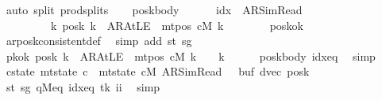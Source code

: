 \begin{isabellebody}
\ {\isacharparenleft}{\kern0pt}auto\ split{\isacharcolon}{\kern0pt}\ prod{\isachardot}{\kern0pt}splits{\isacharparenright}{\kern0pt}\isanewline
\ \ \isamarkupfalse%
\ posk{\isacharunderscore}{\kern0pt}body{\isacharcolon}{\kern0pt}\isanewline
\ \ \ \ \ \ {\isachardoublequoteopen}idx\ {\isacharequal}{\kern0pt}\ AR{\isacharunderscore}{\kern0pt}SimRead\isanewline
\ \ \ \ \ \ \ \ {\isasymlongrightarrow}\ {\isacharparenleft}{\kern0pt}{\isasymforall}k{\isachardot}{\kern0pt}\ posk{}\ k\ {\isacharequal}{\kern0pt}\ AR{\isacharunderscore}{\kern0pt}AtLE\ {\isasymlongleftrightarrow}\ mt{\isacharunderscore}{\kern0pt}pos\ cM\ k\ {\isacharequal}{\kern0pt}\ {}{\isacharparenright}{\kern0pt}{\isachardoublequoteclose}\isanewline
\ \ \ \ \isamarkupfalse%
\ posk{\isacharunderscore}{\kern0pt}ok\ \isamarkupfalse%
\ ar{\isacharunderscore}{\kern0pt}posk{\isacharunderscore}{\kern0pt}consistent{\isacharunderscore}{\kern0pt}def\ \isamarkupfalse%
\ {\isacharparenleft}{\kern0pt}simp\ add{\isacharcolon}{\kern0pt}\ st\ sg{\isacharparenright}{\kern0pt}\isanewline
\ \ \isamarkupfalse%
\ pkok{\isacharcolon}{\kern0pt}\ {\isachardoublequoteopen}posk{}\ k\ {\isacharequal}{\kern0pt}\ AR{\isacharunderscore}{\kern0pt}AtLE\ {\isasymlongleftrightarrow}\ mt{\isacharunderscore}{\kern0pt}pos\ cM\ k\ {\isacharequal}{\kern0pt}\ {}{\isachardoublequoteclose}\ \ k\isanewline
\ \ \ \ \isamarkupfalse%
\ posk{\isacharunderscore}{\kern0pt}body\ idx{\isacharunderscore}{\kern0pt}eq\ \isamarkupfalse%
\ simp\isanewline
\ \ \isamarkupfalse%
\ c{\isacharprime}{\kern0pt}{\isacharunderscore}{\kern0pt}state{\isacharcolon}{\kern0pt}\ {\isachardoublequoteopen}mt{\isacharunderscore}{\kern0pt}state\ c{\isacharprime}{\kern0pt}\ {\isacharequal}{\kern0pt}\ {\isacharparenleft}{\kern0pt}mt{\isacharunderscore}{\kern0pt}state\ cM{\isacharcomma}{\kern0pt}\ AR{\isacharunderscore}{\kern0pt}SimRead{\isacharcomma}{\kern0pt}\ {}{\isacharcomma}{\kern0pt}\ {}{\isacharcomma}{\kern0pt}\ buf{}{\isacharcomma}{\kern0pt}\ dvec{\isacharcomma}{\kern0pt}\ posk{}{\isacharparenright}{\kern0pt}{\isachardoublequoteclose}\isanewline
\ \ \ \ \isamarkupfalse%
\ st\ sg\ qM{\isacharprime}{\kern0pt}{\isacharunderscore}{\kern0pt}eq\ idx{\isacharunderscore}{\kern0pt}eq\ tk{}\ ii{}\ \isamarkupfalse%
\ simp\isanewline
\ \ %

\end{isabellebody}
